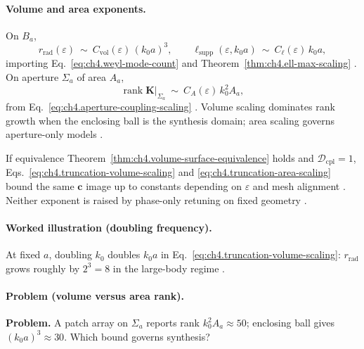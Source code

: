 \paragraph{Volume and area exponents.}
On \(B_{a}\),
\begin{equation}
\label{eq:ch4.truncation-volume-scaling}
r_{\mathrm{rad}}(\varepsilon)
\ \sim\
C_{\mathrm{vol}}(\varepsilon)\,(k_{0}a)^{3},
\qquad
\ell_{\mathrm{supp}}(\varepsilon,k_{0}a)
\ \sim\
C_{\ell}(\varepsilon)\,k_{0}a,
\end{equation}
importing Eq.~\eqref{eq:ch4.weyl-mode-count} and Theorem~\ref{thm:ch4.ell-max-scaling} \cite{stratton1941,jackson1999,hansen1988}.
On aperture \(\Sigma_{a}\) of area \(A_{a}\),
\begin{equation}
\label{eq:ch4.truncation-area-scaling}
\operatorname{rank}\mathbf{K}\big|_{\Sigma_{a}}
\ \sim\
C_{A}(\varepsilon)\,k_{0}^{2}A_{a},
\end{equation}
from Eq.~\eqref{eq:ch4.aperture-coupling-scaling} \cite{collin2001,harrington2001,devaney2004}. Volume scaling dominates rank growth
when the enclosing ball is the synthesis domain; area scaling governs aperture-only models \cite{stratton1941}.

\begin{proposition}[Scaling law consistency]
\label{prop:ch4.truncation-scaling-consistency}
If equivalence Theorem~\ref{thm:ch4.volume-surface-equivalence} holds and \(\mathcal{D}_{\mathrm{cpl}}=1\),
Eqs.~\eqref{eq:ch4.truncation-volume-scaling} and \eqref{eq:ch4.truncation-area-scaling} bound the same \(\mathbf{c}\) image up to
constants depending on \(\varepsilon\) and mesh alignment \cite{stratton1941,harrington2001,collin2001}. Neither exponent is raised by
phase-only retuning on fixed geometry \cite{devaney2004,hansen1988}.
\end{proposition}

\paragraph{Worked illustration (doubling frequency).}
At fixed \(a\), doubling \(k_{0}\) doubles \(k_{0}a\) in Eq.~\eqref{eq:ch4.truncation-volume-scaling}: \(r_{\mathrm{rad}}\) grows
roughly by \(2^{3}=8\) in the large-body regime \cite{jackson1999,harrington2001,hansen1988}.

\paragraph{Problem (volume versus area rank).}
\textbf{Problem.} A patch array on \(\Sigma_{a}\) reports rank \(k_{0}^{2}A_{a}\approx50\); enclosing ball gives \((k_{0}a)^{3}\approx30\).
Which bound governs synthesis?

